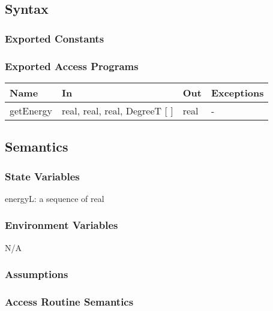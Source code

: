 \documentclass[12pt, titlepage]{article}
\begin{document}
\subsection{Syntax}

\subsubsection{Exported Constants}


\subsubsection{Exported Access Programs}

\begin{center}
\begin{tabular}{p{2cm} p{5cm} p{4cm} p{1cm}}
\hline
\textbf{Name} & \textbf{In} & \textbf{Out} & \textbf{Exceptions} \\
\hline 
getEnergy & real, real, real, DegreeT [ ] & real & - \\


\hline
\end{tabular}
\end{center}


\subsection{Semantics}

\subsubsection{State Variables}

energyL: a sequence of real\\

\subsubsection{Environment Variables}

N/A

\subsubsection{Assumptions}



\subsubsection{ Access Routine Semantics}
\end{document}
